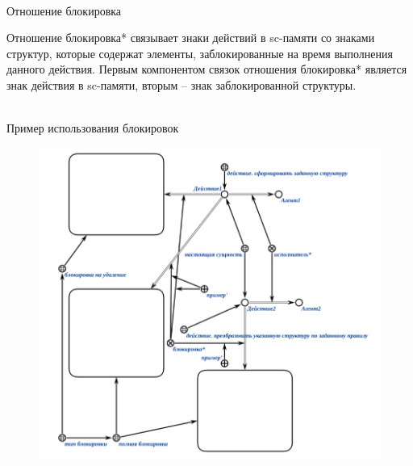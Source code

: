 \begin{frame}{\\Отношение блокировка}
	\topline
\justifying
\begin{SCn}
\end{SCn}
Отношение блокировка* связывает знаки действий в sc-памяти со знаками структур, которые содержат элементы, заблокированные на время выполнения данного действия. Первым компонентом связок отношения блокировка* является знак действия в sc-памяти, вторым – знак заблокированной структуры.
\end{frame}

\begin{frame}{\\Пример использования блокировок}
		\topline
	\justifying
	\vspace{3em}
	\begin{figure}[H]
		\includegraphics[scale=0.25]{./figures/sd_multiagent_processing/blocking_example.png}
	\end{figure}
\end{frame}

